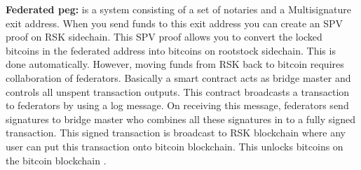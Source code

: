 \textbf{Federated peg:} is a system consisting of a set of notaries and a Multisignature exit address. When you send funds to this exit address you can create an SPV proof on RSK sidechain. This SPV proof allows you to convert the locked bitcoins in the federated address into bitcoins on rootstock sidechain. This is done automatically. However, moving funds from RSK back to bitcoin requires collaboration of federators. Basically a smart contract acts as bridge master and controls all unspent transaction outputs. This contract broadcasts a transaction to federators by using a log message. On receiving this message, federators send signatures to bridge master who combines all these signatures in to a fully signed transaction. This signed transaction is broadcast to RSK blockchain where any user can put this transaction onto bitcoin blockchain. This unlocks bitcoins on the bitcoin blockchain \cite{paper:005}.


